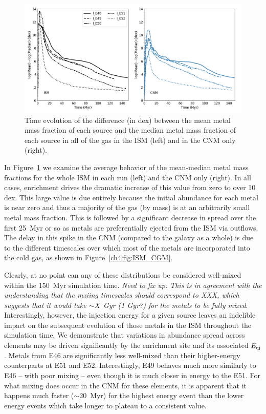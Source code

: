 \begin{figure}
  \centering
  \includegraphics[width=0.975\linewidth]{figures/ch4/ISM_CNM_average_mean-median}
  \caption{Time evolution of the difference (in dex) between the mean metal mass fraction of each source and the median metal mass fraction of each source in all of the gas in the ISM (left) and in the CNM only (right).}
  \label{ch4:fig:mean-median}
\end{figure}

In Figure~\ref{ch4:fig:mean-median} we examine the average behavior of the mean-median metal mass fractions for the whole ISM in each run (left) and the CNM only (right). In all cases, enrichment drives the dramatic increase of this value from zero to over 10 dex. This large value is due entirely because the initial abundance for each metal is near zero and thus a majority of the gas (by mass) is at an arbitrarily small metal mass fraction. This is followed by a significant decrease in spread over the first 25~Myr or so as metals are preferentially ejected from the ISM via outflows. The delay in this spike in the CNM (compared to the galaxy as a whole) is due to the different timescales over which most of the metals are incorporated into the cold gas, as shown in Figure~\ref{ch4:fig:ISM_CGM}.

Clearly, at no point can any of these distributions be considered well-mixed within the 150~Myr simulation time. \textit{Need to fix up: This is in agreement with the understanding that the mxiing timescales should correspond to XXX, which suggests that it would take $\sim$X~Gyr (1 Gyr?) for the metals to be fully mixed}. Interestingly, however, the injection energy for a given source leaves an indelible impact on the subsequent evolution of those metals in the ISM throughout the simulation time. We demonstrate that variations in abundance spread across elements may be driven significantly by the enrichment site and its associated $E_{\rm ej}$. Metals from \runone E46 are significantly less well-mixed than their higher-energy counterparts at \runone E51 and \runone E52. Interestingly, \runone E49 behaves much more similarly to \runone E46 -- with poor mixing -- even though it is much closer in energy to the \runone E51. For what mixing does occur in the CNM for these elements, it is apparent that it happens much faster ($\sim$20~Myr) for the highest energy event than the lower energy events which take longer to plateau to a consistent value.

